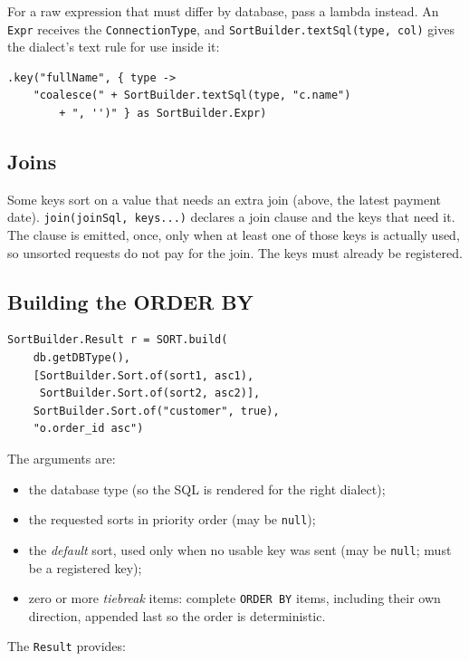 \noindent
For a raw expression that must differ by database, pass a lambda instead.  An \texttt{Expr} receives the \texttt{ConnectionType}, and \texttt{SortBuilder.textSql(type, col)} gives the dialect's text rule for use inside it:

\begin{lstlisting}[style=groovy]
.key("fullName", { type ->
    "coalesce(" + SortBuilder.textSql(type, "c.name")
        + ", '')" } as SortBuilder.Expr)
\end{lstlisting}

\subsection{Joins}

Some keys sort on a value that needs an extra join (above, the latest payment date).  \texttt{join(joinSql, keys...)} declares a join clause and the keys that need it.  The clause is emitted, once, only when at least one of those keys is actually used, so unsorted requests do not pay for the join.  The keys must already be registered.

\subsection{Building the ORDER BY}

\begin{lstlisting}[style=groovy]
SortBuilder.Result r = SORT.build(
    db.getDBType(),
    [SortBuilder.Sort.of(sort1, asc1),
     SortBuilder.Sort.of(sort2, asc2)],
    SortBuilder.Sort.of("customer", true),
    "o.order_id asc")
\end{lstlisting}

\noindent
The arguments are:

\begin{itemize}
  \item the database type (so the SQL is rendered for the right dialect);
  \item the requested sorts in priority order (may be \texttt{null});
  \item the \emph{default} sort, used only when no usable key was sent (may be \texttt{null}; must be a registered key);
  \item zero or more \emph{tiebreak} items: complete \texttt{ORDER BY} items, including their own direction, appended last so the order is deterministic.
\end{itemize}

The \texttt{Result} provides:

